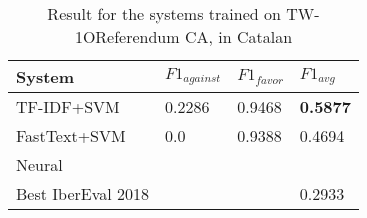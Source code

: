 \documentclass[10pt, a4paper]{article}
\begin{document}
\begin{table}[!h]
\begin{center}
\begin{tabularx}{\columnwidth}{|l|l|l|X|}
\hline
System & $F1_{against}$ & $F1_{favor}$ &$F1_{avg}$\\
\hline
TF-IDF+SVM & 0.2286& 0.9468& \textbf{0.5877} \\
\hline
FastText+SVM& 0.0 & 0.9388&0.4694 \\
\hline
Neural      &   &  &\\ 
\hline
Best IberEval 2018 &    &   &0.2933 \\ 
\hline

\end{tabularx}
\caption{Result for the systems trained on TW-1OReferendum CA, in Catalan}
\end{center}
\label{tab:result_tw1o_ca}
\end{table}






\end{document}
